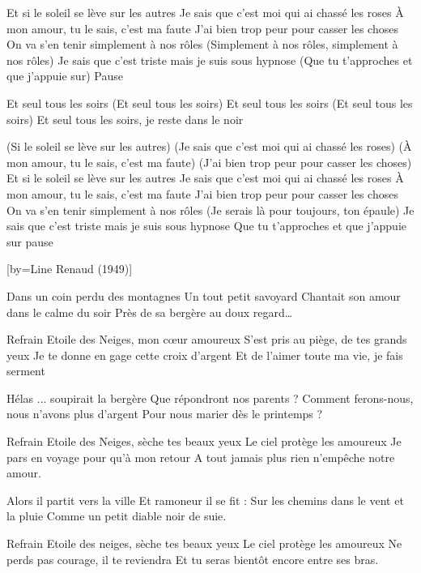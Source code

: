 \beginverse
Et si le soleil se lève sur les autres
Je sais que c’est moi qui ai chassé les roses
À mon amour, tu le sais, c’est ma faute
J’ai bien trop peur pour casser les choses
On va s’en tenir simplement à nos rôles
(Simplement à nos rôles, simplement à nos rôles)
Je sais que c’est triste mais je suis sous hypnose
(Que tu t’approches et que j’appuie sur)
Pause \\[pause]
\endverse

\beginverse
Et seul tous les soirs (Et seul tous les soirs)
Et seul tous les soirs (Et seul tous les soirs)
Et seul tous les soirs, je reste dans le noir \\[4x]
\endverse

(Si le soleil se lève sur les autres)
(Je sais que c’est moi qui ai chassé les roses)
(À mon amour, tu le sais, c’est ma faute)
(J’ai bien trop peur pour casser les choses)
Et si le soleil se lève sur les autres
Je sais que c’est moi qui ai chassé les roses
À mon amour, tu le sais, c’est ma faute
J’ai bien trop peur pour casser les choses
On va s’en tenir simplement à nos rôles
(Je serais là pour toujours, ton épaule)
Je sais que c’est triste mais je suis sous hypnose
Que tu t’approches et que j’appuie sur pause

[by={Line Renaud (1949)}]

\beginverse
Dans un coin perdu des montagnes
Un tout petit savoyard
Chantait son amour dans le calme du soir
Près de sa bergère au doux regard…
\endverse

\beginverse
Refrain
Etoile des Neiges, mon cœur amoureux
S'est pris au piège, de tes grands yeux
Je te donne en gage cette croix d'argent
Et de l'aimer toute ma vie, je fais serment
\endverse

\beginverse
Hélas \! ... soupirait la bergère
Que répondront nos parents ?
Comment ferons-nous, nous n'avons plus d'argent
Pour nous marier dès le printemps ?
\endverse

\beginverse
Refrain
Etoile des Neiges, sèche tes beaux yeux
Le ciel protège les amoureux
Je pars en voyage pour qu'à mon retour
A tout jamais plus rien n'empêche notre amour.
\endverse

\beginverse
Alors il partit vers la ville
Et ramoneur il se fit :
Sur les chemins dans le vent et la pluie
Comme un petit diable noir de suie.
\endverse

\beginverse
Refrain
Etoile des neiges, sèche tes beaux yeux
Le ciel protège les amoureux
Ne perds pas courage, il te reviendra
Et tu seras bientôt encore entre ses bras.
\endverse

